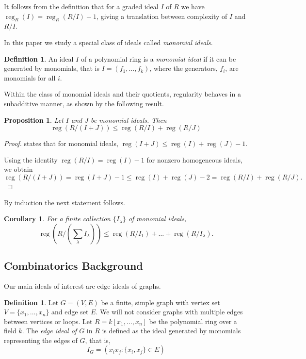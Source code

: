 \documentclass[11pt,letterpaper, reqno]{amsart}
\newtheorem{proposition}[theorem]{Proposition}
\newtheorem{corollary}[theorem]{Corollary}
\theoremstyle{definition}
\newtheorem{definition}[theorem]{Definition}
\theoremstyle{remark}
\DeclareMathOperator{\reg}{reg}
\newcommand{\abk}[1]{{\color{blue} ABK: #1}}
\numberwithin{equation}{section}
\begin{document}
It follows from the definition that for a graded ideal $I$ of $R$ we have $\reg_R(I)=\reg_R(R/I)+1$, giving a translation between complexity of $I$ and $R/I$.

In this paper we study a special class of ideals called \textit{monomial ideals}. 
\begin{definition}
    An ideal $I$ of a polynomial ring is a \textit{monomial ideal} if it can be generated by monomials, that is $I = (f_1,\ldots,f_k)$, where the generators, $f_i$, are monomials for all $i$.
\end{definition}

Within the class of monomial ideals and their quotients, regularity behaves in a  subadditive manner, as shown by the following result.

\begin{proposition}\label{thm: reg sum}
    Let $I$ and $J$ be monomial ideals. Then
    \[
    \reg(R/(I+J))\leq \reg(R/I)+\reg(R/J)
    \]
\end{proposition}
\begin{proof}
    \cite[Corollary 3.2(b)]{Herzog} states that for monomial ideals, $\reg(I + J) \leq \reg(I) + \reg(J) - 1$.
    
    Using the identity $\reg(R/I)=\reg(I)-1$ for nonzero homogeneous ideals, we obtain 
    \[
    \reg(R/(I+J))= \reg(I+J)-1\leq \reg(I)+\reg(J)-2= \reg(R/I)+\reg(R/J).
    \]
\end{proof}

By induction the next statement follows.

\begin{corollary}\label{2.9}
    For a finite collection $\{I_\lambda\}$ of monomial ideals, 
    \[
    \reg\left(R/\left(\sum_{\lambda} I_\lambda\right)\right)\leq \reg(R/I_1)+\ldots + \reg(R/I_\lambda).
    \]
\end{corollary}




\subsection{Combinatorics Background}
 
Our main ideals of interest are edge ideals of graphs.

\begin{definition}
Let $G=(V,E)$ be a finite, simple graph with vertex set $V=\{x_1,\ldots, x_n\}$ and edge set $E$. We will not consider graphs with multiple edges between vertices or loops. Let $R=k[x_1,\ldots,x_n]$ be the polynomial ring over a field $k$. The \textit{edge ideal of $G$} in $R$ is defined as the ideal generated by monomials representing the edges of $G$, that is,
    \[
    I_G=\left(x_ix_j:\{x_i,x_j\} \in E\right)
    \]
\end{definition}
\end{document}
